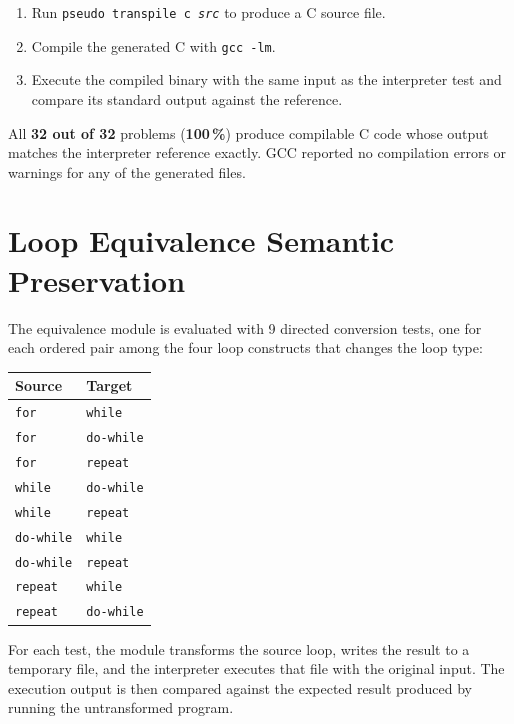 \begin{enumerate}
  \item Run \texttt{pseudo transpile c \textit{src}} to produce a C source
        file.
  \item Compile the generated C with \texttt{gcc -lm}.
  \item Execute the compiled binary with the same input as the interpreter
        test and compare its standard output against the reference.
\end{enumerate}

All \textbf{32 out of 32} problems (\textbf{100\,\%}) produce compilable C
code whose output matches the interpreter reference exactly.  GCC reported
no compilation errors or warnings for any of the generated files.

\section{Loop Equivalence Semantic Preservation}
\label{sec:equivalence-eval}

The equivalence module is evaluated with 9 directed conversion tests, one
for each ordered pair among the four loop constructs that changes the loop
type:

\begin{center}
\small
\begin{tabular}{ll}
\hline
\textbf{Source} & \textbf{Target} \\
\hline
\texttt{for}         & \texttt{while}    \\
\texttt{for}         & \texttt{do-while} \\
\texttt{for}         & \texttt{repeat}   \\
\texttt{while}       & \texttt{do-while} \\
\texttt{while}       & \texttt{repeat}   \\
\texttt{do-while}    & \texttt{while}    \\
\texttt{do-while}    & \texttt{repeat}   \\
\texttt{repeat}      & \texttt{while}    \\
\texttt{repeat}      & \texttt{do-while} \\
\hline
\end{tabular}
\end{center}

For each test, the module transforms the source loop, writes the result to a
temporary file, and the interpreter executes that file with the original
input.  The execution output is then compared against the expected result
produced by running the untransformed program.

